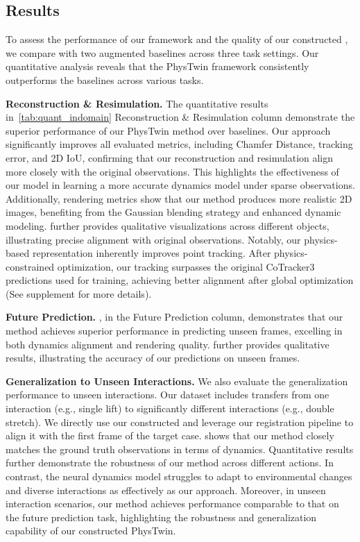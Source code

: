\subsection{Results}

To assess the performance of our framework and the quality of our constructed \ourabbr,
we compare with two augmented baselines across three task settings. Our quantitative analysis reveals that the PhysTwin framework consistently outperforms the baselines across various tasks. 

\textbf{Reconstruction \& Resimulation.}  
The quantitative results in~\cref{tab:quant_indomain} Reconstruction \& Resimulation column demonstrate the superior performance of our PhysTwin method over baselines. Our approach significantly improves all evaluated metrics, including Chamfer Distance, tracking error, and 2D IoU, confirming that our reconstruction and resimulation align more closely with the original observations. This highlights the effectiveness of our model in learning a more accurate dynamics model under sparse observations.
Additionally, rendering metrics show that our method produces more realistic 2D images, benefiting from the Gaussian blending strategy and enhanced dynamic modeling.  further provides qualitative visualizations across different objects, illustrating precise alignment with original observations.
Notably, our physics-based representation inherently improves point tracking. After physics-constrained optimization, our tracking surpasses the original CoTracker3~\cite{karaev2024cotracker3} predictions used for training, achieving better alignment after global optimization (See supplement for more details).

\textbf{Future Prediction.}  
, in the Future Prediction column, demonstrates that our method achieves superior performance in predicting unseen frames, excelling in both dynamics alignment and rendering quality.  further provides qualitative results, illustrating the accuracy of our predictions on unseen frames.

\textbf{Generalization to Unseen Interactions.}  
We also evaluate the generalization performance to unseen interactions. 
Our dataset includes transfers from one interaction (e.g., single lift) to significantly different interactions (e.g., double stretch). 
We directly use our constructed \ourabbr and leverage our registration pipeline to align it with the first frame of the target case.  shows that our method closely matches the ground truth observations in terms of dynamics. Quantitative results further demonstrate the robustness of our method across different actions. In contrast, the neural dynamics model struggles to adapt to environmental changes and diverse interactions as effectively as our approach. Moreover, in unseen interaction scenarios, our method achieves performance comparable to that on the future prediction task, highlighting the robustness and generalization capability of our constructed PhysTwin.

